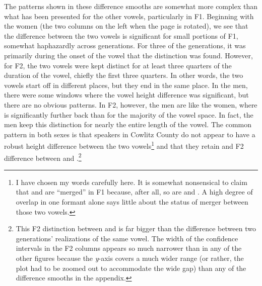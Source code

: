 The patterns shown in these difference smooths are somewhat more complex than what has been presented for the other vowels, particularly in F1. Beginning with the women (the two columns on the left when the page is rotated), we see that the difference between the two vowels is significant for small portions of F1, somewhat haphazardly across generations. For three of the generations, it was primarily during the onset of the vowel that the distinction was found. However, for F2, the two vowels were kept distinct for at least three quarters of the duration of the vowel, chiefly the first three quarters. In other words, the two vowels start off in different places, but they end in the same place. In the men, there were some windows where the vowel height difference was significant, but there are no obvious patterns. In F2, however, the men are like the women, where \thought is significantly further back than \lot for the majority of the vowel space. In fact, the men keep this distinction for nearly the entire length of the vowel. The common pattern in both sexes is that speakers in Cowlitz County do not appear to have a robust height difference between the two vowels\footnote{I have chosen my words carefully here. It is somewhat nonsensical to claim that \lot and \thought are ``merged'' in F1 because, after all, so are \fleece and \goose. A high degree of overlap in one formant alone says little about the status of merger between those two vowels.} and that they retain and F2 difference between \lot and \thought.\footnote{This F2 distinction between \lot and \thought is far bigger than the difference between two generations' realizations of the same vowel. The width of the confidence intervals in the F2 columns appears so much narrower than in any of the other figures because the \textit{y}-axis covers a much wider range (or rather, the plot had to be zoomed out to accommodate the wide gap) than any of the difference smooths in the appendix.}

